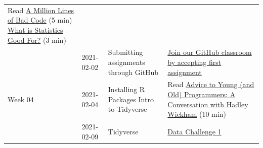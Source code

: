 \documentclass[
]{book}
\begin{document}
\begin{longtable}[]{@{}llll@{}}
\begin{minipage}[t]{0.22\columnwidth}
Read \href{http://varianceexplained.org/programming/bad-code/}{A Million Lines of Bad Code} (5 min) \href{readings/module7_eds_whats_stats.pdf}{What is Statistics Good For?} (3 min)\strut
\end{minipage}\tabularnewline
\begin{minipage}[t]{0.22\columnwidth}\raggedright
\strut
\end{minipage} & \begin{minipage}[t]{0.22\columnwidth}\raggedright
2021-02-02\strut
\end{minipage} & \begin{minipage}[t]{0.22\columnwidth}\raggedright
Submitting assignments through GitHub\strut
\end{minipage} & \begin{minipage}[t]{0.22\columnwidth}\raggedright
\href{https://classroom.github.com/a/zjVO8fZw}{Join our GitHub classroom by accepting first assignment}\strut
\end{minipage}\tabularnewline
\begin{minipage}[t]{0.22\columnwidth}\raggedright
Week 04\strut
\end{minipage} & \begin{minipage}[t]{0.22\columnwidth}\raggedright
2021-02-04\strut
\end{minipage} & \begin{minipage}[t]{0.22\columnwidth}\raggedright
Installing R Packages Intro to Tidyverse\strut
\end{minipage} & \begin{minipage}[t]{0.22\columnwidth}\raggedright
Read \href{https://www.r-bloggers.com/advice-to-young-and-old-programmers-a-conversation-with-hadley-wickham/}{Advice to Young (and Old) Programmers: A Conversation with Hadley Wickham} (10 min)\strut
\end{minipage}\tabularnewline
\begin{minipage}[t]{0.22\columnwidth}\raggedright
\strut
\end{minipage} & \begin{minipage}[t]{0.22\columnwidth}\raggedright
2021-02-09\strut
\end{minipage} & \begin{minipage}[t]{0.22\columnwidth}\raggedright
Tidyverse\strut
\end{minipage} & \begin{minipage}[t]{0.22\columnwidth}\raggedright
\href{https://classroom.github.com/a/zjVO8fZw}{Data Challenge 1}\strut
\end{minipage}\tabularnewline

\end{longtable}
\end{document}
